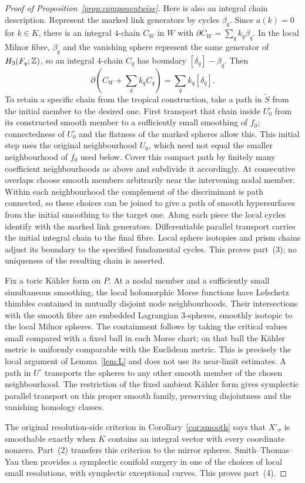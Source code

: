 \begin{proof}[Proof of Proposition~\ref{prop:componentwise}]
Here is also an integral chain description. Represent the marked link
generators by cycles $\beta_q$. Since $a(k)=0$ for $k\in K$, there is
an integral $4$-chain $C_W$ in $W$ with
$\partial C_W=\sum_q k_q\beta_q$.
In the local Milnor fibre, $\beta_q$ and the vanishing sphere represent
the same generator of $H_3(F_q;\mathbb Z)$, so an integral $4$-chain $C_q$
has boundary $[\delta_q]-\beta_q$. Then
\[
 \partial\left(C_W+\sum_qk_qC_q\right)
       =\sum_qk_q[\delta_q].
\]
To retain a specific chain from the tropical construction, take a path
in $\widetilde S$ from the initial member to the desired one.
First transport that chain inside $U_0^\circ$ from its constructed
smooth member to a sufficiently small smoothing of $f_0$;
connectedness of $U_0^\circ$ and the flatness of the marked spheres
allow this. This initial step uses the original neighbourhood $U_0$,
which need not equal the smaller neighbourhood of $f_0$ used below.
Cover this compact path by finitely many coefficient neighbourhoods
as above and subdivide it accordingly. At consecutive overlaps choose
smooth members arbitrarily near the intervening nodal member.
Within each neighbourhood the complement of the discriminant is
path connected, so these choices can be joined to give a path of
smooth hypersurfaces from the initial smoothing to the target one.
Along each piece the local cycles identify with the marked link
generators. Differentiable parallel transport carries the initial
integral chain to the final fibre. Local sphere isotopies and prism
chains adjust its boundary to the specified fundamental cycles.
This proves part~(3); no uniqueness of the resulting chain is asserted.

Fix a toric K\"ahler form on $P$. At a nodal member and a sufficiently
small simultaneous smoothing, the local holomorphic Morse functions
have Lefschetz thimbles contained in mutually disjoint node
neighbourhoods. Their intersections with the smooth fibre are
embedded Lagrangian $3$-spheres, smoothly isotopic to the local Milnor
spheres. The containment follows by taking the critical values small
compared with a fixed ball in each Morse chart; on that ball the
K\"ahler metric is uniformly comparable with the Euclidean metric.
This is precisely the local argument of Lemma~\ref{lem:L} and does
not use its near-limit estimates. A path in $U^\circ$ transports the
spheres to any other smooth member of the chosen neighbourhood.
The restriction of the fixed ambient K\"ahler form gives symplectic
parallel transport on this proper smooth family, preserving
disjointness and the vanishing homology classes.

The original resolution-side criterion in Corollary~\ref{cor:smooth} says
that $X'_\sigma$ is smoothable exactly when $K$ contains an integral
vector with every coordinate nonzero. Part~(2) transfers this criterion
to the mirror spheres. Smith--Thomas--Yau \cite[Thm.~2.9]{STY} then
provides a symplectic conifold surgery in one of the choices of local
small resolutions, with symplectic exceptional curves. This proves
part~(4).
\end{proof}

